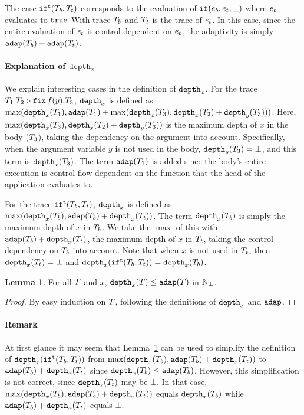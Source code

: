 \documentclass[a4paper,11pt]{article}
\theoremstyle{definition}
\newtheorem{lem}[thm]{Lemma}
\begin{document}
The case $\mathtt{if}^{\mathtt{t}}(T_b, T_t)$ corresponds to the evaluation of
$\mathtt{if}(e_b, e_t, \_)$ where $e_b$ evaluates to $\mathtt{true}$
With trace $T_b$ and $T_t$ is the trace of $e_t$. In this
case, since the entire evaluation of $e_t$ is control dependent on
$e_b$, the adaptivity is simply $\mathtt{adap}(T_b) + \mathtt{adap}(T_t)$.

\paragraph{Explanation of $\mathtt{depth}_{x}$}
We explain interesting cases in the definition of $\mathtt{depth}_{x}$.  For the
trace $T_1 \; T_2 \mathrel{\triangleright} {\mathop{\mathtt{fix}} f(y).T_3}$, $\mathtt{depth}_{x}$ is defined as
$\max(\mathtt{depth}_{x}(T_1), \mathtt{adap}(T_1) + \max(\mathtt{depth}_{x}(T_3),
\mathtt{depth}_{x}(T_2) + \mathtt{depth}_{y}(T_3)))$. Here, $\max(\mathtt{depth}_{x}(T_3),
\mathtt{depth}_{x}(T_2) + \mathtt{depth}_{y}(T_3))$ is the maximum depth of $x$ in the
body ($T_3$), taking the dependency on the argument into
account. Specifically, when the argument variable $y$ is not used in
the body, $\mathtt{depth}_{y}(T_3) = \bot$, and this term is
$\mathtt{depth}_{x}(T_3)$.  The term $\mathtt{adap}(T_1)$ is added since the body's
entire execution is control-flow dependent on the function that the
head of the application evaluates to.

For the trace $\mathtt{if}^{\mathtt{t}}(T_b, T_t)$, $\mathtt{depth}_{x}$ is defined as
$\max(\mathtt{depth}_{x}(T_b), \mathtt{adap}(T_b) + \mathtt{depth}_{x}(T_t))$. The term
$\mathtt{depth}_{x}(T_b)$ is simply the maximum depth of $x$ in $T_b$. We
take the $\max$ of this with $\mathtt{adap}(T_b) + \mathtt{depth}_{x}(T_t)$, the
maximum depth of $x$ in $T_t$, taking the control dependency on
$T_b$ into account. Note that when $x$ is not used in $T_t$, then
$\mathtt{depth}_{x}(T_t) = \bot$ and $\mathtt{depth}_{x}(\mathtt{if}^{\mathtt{t}}(T_b, T_t)) =
\mathtt{depth}_{x}(T_b)$.

\begin{lem}\label{lem:ddep-leq-adap}
For all $T$ and $x$, $\mathtt{depth}_{x}(T) \leq \mathtt{adap}(T)$ in $\mathbb{N}_{\bot}$.
\end{lem}
%
\begin{proof}
By easy induction on $T$, following the definitions of $\mathtt{depth}_{x}$
and $\mathtt{adap}$.
\end{proof}



\paragraph{Remark}
At first glance it may seem that Lemma~\ref{lem:ddep-leq-adap} can be
used to simplify the definition of $\mathtt{depth}_{x}(\mathtt{if}^{\mathtt{t}}(T_b, T_t))$
from $\max(\mathtt{depth}_{x}(T_b), \mathtt{adap}(T_b) + \mathtt{depth}_{x}(T_t))$ to
$\mathtt{adap}(T_b) + \mathtt{depth}_{x}(T_t)$ since $\mathtt{depth}_{x}(T_b) \leq
\mathtt{adap}(T_b)$. However, this simplification is not correct, since
$\mathtt{depth}_{x}(T_t)$ may be $\bot$. In that case, $\max(\mathtt{depth}_{x}(T_b),
\mathtt{adap}(T_b) + \mathtt{depth}_{x}(T_t))$ equals $\mathtt{depth}_{x}(T_b)$ while
$\mathtt{adap}(T_b) + \mathtt{depth}_{x}(T_t)$ equals $\bot$.
\end{document}

